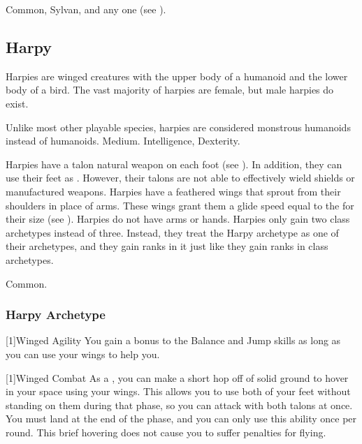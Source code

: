          Common, Sylvan, and any one  (see ).

    \subsection{Harpy}
        Harpies are winged creatures with the upper body of a humanoid and the lower body of a bird.
        The vast majority of harpies are female, but male harpies do exist.

         Unlike most other playable species, harpies are considered monstrous humanoids instead of humanoids.
         Medium.
          Intelligence,  Dexterity.
        \begin{itemize}
             Harpies have a talon natural weapon on each foot (see ).
                In addition, they can use their feet as .
                However, their talons are not able to effectively wield shields or manufactured weapons.
             Harpies have a feathered wings that sprout from their shoulders in place of arms.
                These wings grant them a glide speed equal to the  for their size (see ).
             Harpies do not have arms or hands.
             Harpies only gain two class archetypes instead of three.
                Instead, they treat the Harpy archetype as one of their archetypes, and they gain ranks in it just like they gain ranks in class archetypes.
        \end{itemize}
         Common.
        
        \subsubsection{Harpy Archetype}

            [1]{Winged Agility} You gain a  bonus to the Balance and Jump skills as long as you can use your wings to help you.

            [1]{Winged Combat} As a , you can make a short hop off of solid ground to hover in your space using your wings.
            This allows you to use both of your feet without standing on them during that phase, so you can attack with both talons at once.
            You must land at the end of the phase, and you can only use this ability once per round.
            This brief hovering does not cause you to suffer penalties for flying.

